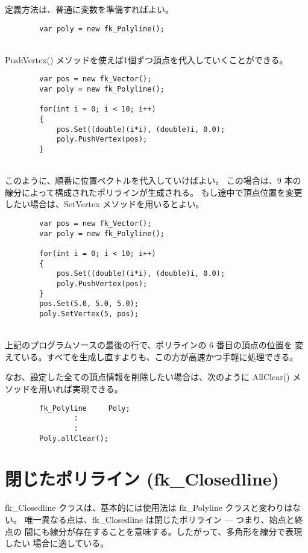 定義方法は、普通に変数を準備すればよい。
\\
\begin{screen}
\begin{verbatim}
        var poly = new fk_Polyline();
\end{verbatim}
\end{screen}
~ \\
PushVertex() メソッドを使えば1個ずつ頂点を代入していくことができる。
\\
\begin{breakbox}
\begin{verbatim}
        var pos = new fk_Vector();
        var poly = new fk_Polyline();

        for(int i = 0; i < 10; i++)
        {
            pos.Set((double)(i*i), (double)i, 0.0);
            poly.PushVertex(pos);
        }
\end{verbatim}
\end{breakbox}
~ \\
このように、順番に位置ベクトルを代入していけばよい。
この場合は、9 本の線分によって構成されたポリラインが生成される。
もし途中で頂点位置を変更したい場合は、SetVertex メソッドを用いるとよい。
\\
\begin{breakbox}
\begin{verbatim}
        var pos = new fk_Vector();
        var poly = new fk_Polyline();

        for(int i = 0; i < 10; i++)
        {
            pos.Set((double)(i*i), (double)i, 0.0);
            poly.PushVertex(pos);
        }
        pos.Set(5.0, 5.0, 5.0);
        poly.SetVertex(5, pos);
\end{verbatim}
\end{breakbox}
~ \\
上記のプログラムソースの最後の行で、ポリラインの 6 番目の頂点の位置を
変えている。すべてを生成し直すよりも、この方が高速かつ手軽に処理できる。

なお、設定した全ての頂点情報を削除したい場合は、次のように
AllClear() メソッドを用いれば実現できる。
\\
\begin{screen}
\begin{verbatim}
        fk_Polyline     Poly;
                :
                :
        Poly.allClear();
\end{verbatim}
\end{screen}

\section{閉じたポリライン (fk\_Closedline)}
fk\_Closedline クラスは、基本的には使用法は fk\_Polyline クラスと変わりはない。
唯一異なる点は、fk\_Closedline は閉じたポリライン --- つまり、始点と終点の
間にも線分が存在することを意味する。したがって、多角形を線分で表現したい
場合に適している。

